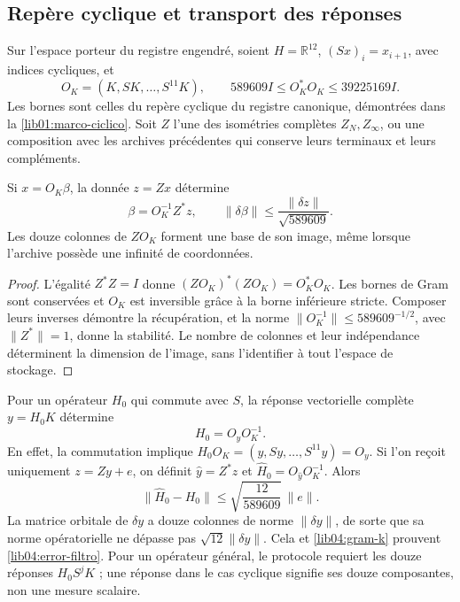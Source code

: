 \subsection{Repère cyclique et transport des réponses}
\label{lib04:marco}

Sur l'espace porteur du registre engendré, soient \(H=\mathbb R^{12}\), \((Sx)_i=x_{i+1}\), avec indices cycliques, et
\begin{equation}
 O_K=(K,SK,\ldots,S^{11}K),\qquad
 589609I\leq O_K^*O_K\leq39225169I.
 \label{lib04:gram-k}
\end{equation}
Les bornes sont celles du repère cyclique du registre canonique,
démontrées dans la \cref{lib01:marco-ciclico}.
Soit \(Z\) l’une des isométries complètes
\(Z_N,Z_\infty\), ou une composition avec les archives précédentes
qui conserve leurs terminaux et leurs compléments.

\begin{theorem}
\label{lib04:teo-marco}
Si \(x=O_K\beta\), la donnée \(z=Zx\) détermine
\begin{equation}
 \beta=O_K^{-1}Z^*z,\qquad
 \|\delta\beta\|\leq\frac{\|\delta z\|}{\sqrt{589609}}.
 \label{lib04:inversa-marco}
\end{equation}
Les douze colonnes de \(ZO_K\) forment une base de son image, même lorsque l'archive possède une infinité de coordonnées.
\end{theorem}

\begin{proof}
L'égalité \(Z^*Z=I\) donne \((ZO_K)^*(ZO_K)=O_K^*O_K\). Les bornes de Gram sont conservées et \(O_K\) est inversible grâce à la borne inférieure stricte. Composer leurs inverses démontre la récupération, et la norme \(\|O_K^{-1}\|\leq589609^{-1/2}\), avec \(\|Z^*\|=1\), donne la stabilité. Le nombre de colonnes et leur indépendance déterminent la dimension de l'image, sans l'identifier à tout l'espace de stockage.
\end{proof}

Pour un opérateur \(H_0\) qui commute avec \(S\), la réponse
vectorielle complète \(y=H_0K\) détermine
\begin{equation}
 H_0=O_yO_K^{-1}.
 \label{lib04:identificacion-filtro}
\end{equation}
En effet, la commutation implique
\(H_0O_K=(y,Sy,\ldots,S^{11}y)=O_y\). Si l’on reçoit uniquement
\(z=Zy+e\), on définit \(\widehat y=Z^*z\) et
\(\widehat H_0=O_{\widehat y}O_K^{-1}\). Alors
\begin{equation}
 \|\widehat H_0-H_0\|
 \leq\sqrt{\frac{12}{589609}}\,\|e\|.
 \label{lib04:error-filtro}
\end{equation}
La matrice orbitale de \(\delta y\) a douze colonnes de norme
\(\|\delta y\|\), de sorte que sa norme opératorielle ne dépasse pas
\(\sqrt{12}\|\delta y\|\). Cela et
\eqref{lib04:gram-k} prouvent \eqref{lib04:error-filtro}.
Pour un opérateur général, le protocole requiert les douze réponses
\(H_0S^jK\) ; une réponse dans le cas cyclique signifie ses douze
composantes, non une mesure scalaire.

